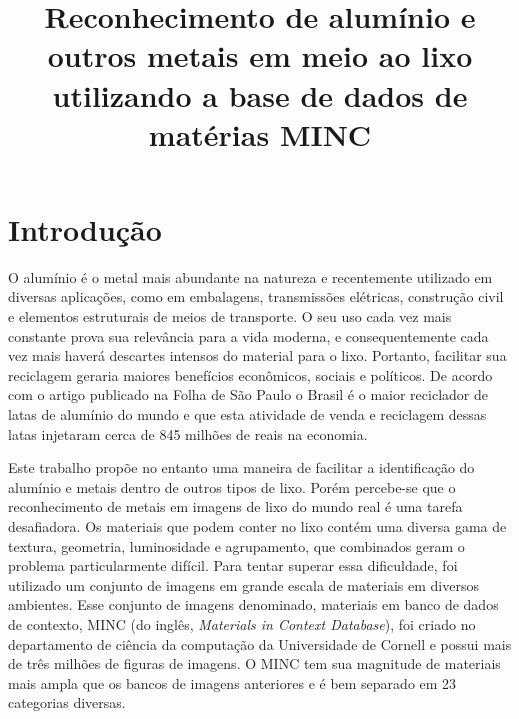 \documentclass[conference, compsoc, 12pt]{IEEEtran}
\begin{document}
%
\title{Reconhecimento de alumínio e outros metais em meio ao lixo utilizando a base de dados de matérias MINC}

\author{
\and
{}
}

\maketitle


\IEEEpeerreviewmaketitle

\begin{abstract}

\end{abstract}


\section{Introdução}

O alumínio é o metal mais abundante na natureza e recentemente utilizado em diversas aplicações, como em embalagens, transmissões elétricas, construção civil e elementos estruturais de meios de transporte. O seu uso cada vez mais constante prova sua relevância para a vida moderna, e consequentemente cada vez mais haverá descartes intensos do material para o lixo. Portanto, facilitar sua reciclagem geraria maiores benefícios econômicos, sociais e políticos. De acordo com o artigo publicado na Folha de São Paulo o Brasil é o maior reciclador de latas de alumínio do mundo e que esta atividade de venda e reciclagem dessas latas injetaram cerca de 845 milhões de reais na economia.

Este trabalho propõe no entanto uma maneira de facilitar a identificação do alumínio e metais dentro de outros tipos de lixo. Porém percebe-se que o reconhecimento de metais em imagens de lixo do mundo real é uma tarefa desafiadora. Os materiais que podem conter no lixo contém uma diversa gama de textura, geometria, luminosidade e agrupamento, que combinados geram o problema particularmente difícil. Para tentar superar essa dificuldade, foi utilizado um conjunto de imagens em grande escala de materiais em diversos ambientes. Esse conjunto de imagens denominado, materiais em banco de dados de contexto, MINC (do inglês, \textit{Materials in Context Database}), foi criado no departamento de ciência da computação da Universidade de Cornell e possui mais de três milhões de figuras de imagens. O MINC tem sua magnitude de materiais mais ampla que os bancos de imagens anteriores e é bem separado em 23 categorias diversas.
\end{document}
